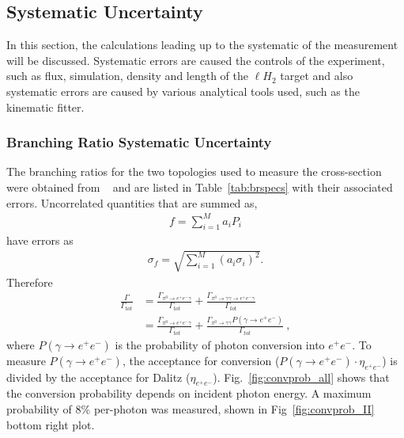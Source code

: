 \subsection{Systematic Uncertainty}\label{sec:results.systematics}

In this section, the calculations leading up to the systematic of the measurement will be discussed. Systematic errors are caused the controls of the experiment, such as flux, simulation, density and length of the $\ell H_2$ target and also systematic errors are caused by various analytical tools used, such as the kinematic fitter.
\subsubsection{Branching Ratio Systematic Uncertainty}
The branching ratios for the two topologies used to measure the cross-section were obtained from \label{abbr:pdg}~\cite{pdg2014} and are listed in Table~\ref{tab:brspecs} with their associated errors. Uncorrelated quantities that are summed as,
\begin{align}
f = \sum_{i = 1}^{M}a_iP_i  
\end{align}
have errors as
\begin{align}
\sigma_f = \sqrt{\sum_{i = 1}^{M}\left(a_i\sigma_i\right)^2}.  
\end{align}
Therefore
\begin{align}
 \frac{\Gamma}{\Gamma_{tot}} &  = \frac{\Gamma_{\pi^{0}\rightarrow e^{+}e^{-}\gamma}}{\Gamma_{tot}} + \frac{\Gamma_{\pi^{0}\rightarrow \gamma \gamma \to e^{+}e^{-}\gamma}}{\Gamma_{tot}}  \\ & = \frac{\Gamma_{\pi^{0}\rightarrow e^{+}e^{-}\gamma}}{\Gamma_{tot}} + \frac{\Gamma_{\pi^{0}\rightarrow \gamma \gamma}P(\gamma \to  e^{+}e^{-})}{\Gamma_{tot}} \ ,
\end{align}
where $P(\gamma \to  e^{+}e^{-})$ is the probability of photon conversion into $e^+e^-$. To measure $P(\gamma \to  e^{+}e^{-})$, the acceptance for conversion ($P(\gamma \to  e^{+}e^{-})\cdot\eta_{e^+e^-}$) is divided by the acceptance for Dalitz ($\eta_{e^+e^-}$). Fig.~\ref{fig:convprob_all} shows that the conversion probability depends on incident photon energy. A maximum probability of 8\%  per-photon was measured, shown in Fig~\ref{fig:convprob_II} bottom right plot. 
